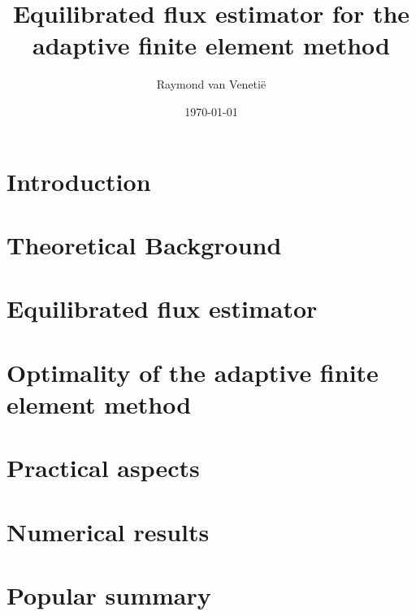 \documentclass{uvamath}
\title{Equilibrated flux estimator for the adaptive finite element method} %
\author[raymond.van.venetie@gmail.com, 10004627]{Raymond van Veneti\"e} %
\date{\today} %
\theoremstyle{plain}%
\theoremstyle{definition}
\theoremstyle{remark}
\newcommand{\1}{\mathds{1}}
\begin{document}
\maketitle
\begin{abstract}
  
\end{abstract}

\setcounter{tocdepth}{1}
\tableofcontents

\chapter*{Introduction}


\chapter{Theoretical Background}


\chapter{Equilibrated flux estimator}


\chapter{Optimality of the adaptive finite element method}


\chapter{Practical aspects}


\chapter{Numerical results}


%

\chapter*{Popular summary}

\end{document}
